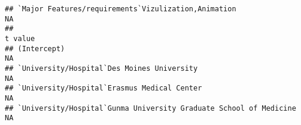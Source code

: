 \documentclass[]{article}
\begin{document}
\begin{verbatim}
## `Major Features/requirements`Vizulization,Animation                                                                                                                                                                                                                                                                                                                                                                                                                                     NA
##                                                                                                                                                                                                                                                                                                                                                                                                                                                                                 t value
## (Intercept)                                                                                                                                                                                                                                                                                                                                                                                                                                                                          NA
## `University/Hospital`Des Moines University                                                                                                                                                                                                                                                                                                                                                                                                                                           NA
## `University/Hospital`Erasmus Medical Center                                                                                                                                                                                                                                                                                                                                                                                                                                          NA
## `University/Hospital`Gunma University Graduate School of Medicine                                                                                                                                                                                                                                                                                                                                                                                                                    NA

\end{verbatim}
\end{document}
